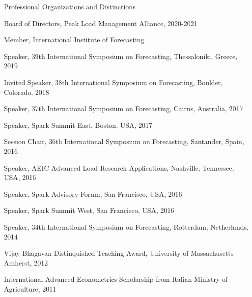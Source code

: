\documentclass{resume} %
\begin{document}
\begin{rSection}{Professional Organizations and Distinctions}

\item Board of Directors, Peak Load Management Alliance, 2020-2021
\item Member, International Institute of Forecasting
\item Speaker, 39th International Symposium on Forecasting, Thessaloniki, Greece, 2019
\item Invited Speaker, 38th International Symposium on Forecasting, Boulder, Colorado, 2018
\item Speaker, 37th International Symposium on Forecasting, Cairns, Australia, 2017
\item Speaker, Spark Summit East, Boston, USA, 2017
\item Session Chair, 36th International Symposium on Forecasting, Santander, Spain, 2016
\item Speaker, AEIC Advanced Load Research Applications, Nashville, Tennessee, USA, 2016
\item Speaker, Spark Advisory Forum, San Francisco, USA, 2016
\item Speaker, Spark Summit West, San Francisco, USA, 2016
\item Speaker, 34th International Symposium on Forecasting, Rotterdam, Netherlands, 2014
\item Vijay Bhagavan Distinquished Teaching Award, University of Massachusetts Amherst, 2012
\item International Advanced Econometrics Scholarship from Italian Ministry of Agriculture, 2011

\end{rSection}
\end{document}
